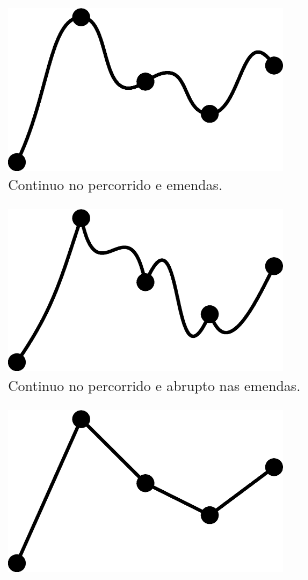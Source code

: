 \begin{figure}[!h]
     \centering
     \begin{subfigure}[b]{0.35\textwidth}
         \centering
         \includegraphics[width=0.8\textwidth]{chapters/cap-musicalidade/continudade-a.eps}
         \caption{Continuo no percorrido e emendas.}
         \label{fig:continudade-a}
     \end{subfigure}
     \hfill
     \begin{subfigure}[b]{0.35\textwidth}
         \centering
         \includegraphics[width=0.8\textwidth]{chapters/cap-musicalidade/continudade-b.eps}
         \caption{Continuo no percorrido e abrupto nas emendas.}
         \label{fig:continudade-b}
     \end{subfigure}
     \hfill
     \begin{subfigure}[b]{0.35\textwidth}
         \centering
         \includegraphics[width=0.8\textwidth]{chapters/cap-musicalidade/continudade-c.eps}

\end{subfigure}
\end{figure}
